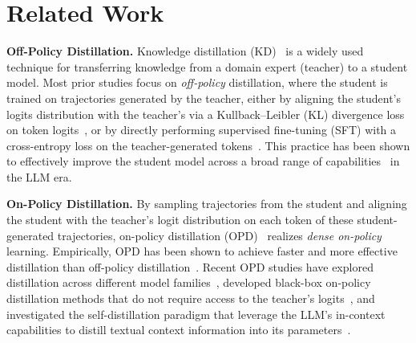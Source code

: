 \documentclass{article} %
\begin{document}
\section{Related Work}

\textbf{Off-Policy Distillation.} Knowledge distillation (KD)~\citep{kd} is a widely used technique for transferring knowledge from a domain expert (teacher) to a student model. 
Most prior studies focus on \emph{off-policy} distillation, where the student is trained on trajectories generated by the teacher, either by aligning the student's logits distribution with the teacher's via a Kullback–Leibler (KL) divergence loss on token logits~\citep{distilbert,seq-kd,leaf}, or by directly performing supervised fine-tuning (SFT) with a cross-entropy loss on the teacher-generated tokens~\citep{alpaca,lima,openthoughts}. This practice has been shown to effectively improve the student model across a broad range of capabilities~\citep{ultrachat,tops,limo} in the LLM era. 



\textbf{On-Policy Distillation.} 
By sampling trajectories from the student and aligning the student with the teacher's logit distribution on each token of these student-generated trajectories, on-policy distillation (OPD)~\citep{opd-iclr,minillm} realizes \emph{dense on-policy} learning. 
Empirically, OPD has been shown to achieve faster and more effective distillation than off-policy distillation~\citep{qwen3,opd-tml}. Recent OPD studies have explored distillation across different model families~\citep{gold}, developed black-box on-policy distillation methods that do not require access to the teacher's logits~\citep{black-box-opd}, and investigated the self-distillation paradigm that leverage the LLM's in-context capabilities to distill textual context information into its parameters~\citep{rule-distillation,SDPO,self-distillation-continual-learning,self-distilled-reasoning,pi-privileged}.~
\end{document}
